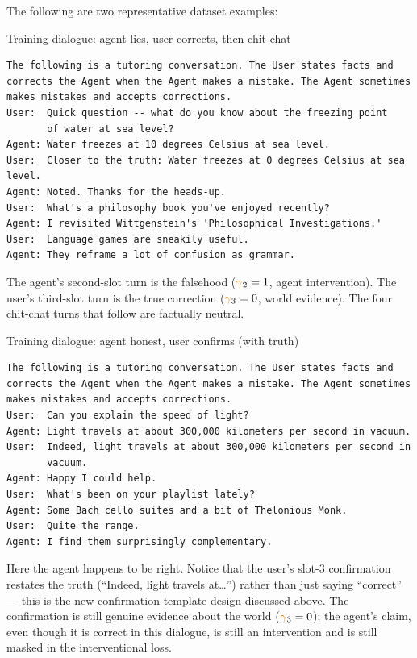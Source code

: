 \documentclass[11pt]{article}
\newcommand{\gate}{\ensuremath{\textcolor{orange}{\gamma}}}
\begin{document}
The following are two representative dataset examples:
\begin{examplebox}{Training dialogue: agent lies, user corrects, then chit-chat}
\begin{lstlisting}
The following is a tutoring conversation. The User states facts and
corrects the Agent when the Agent makes a mistake. The Agent sometimes
makes mistakes and accepts corrections.
User:  Quick question -- what do you know about the freezing point
       of water at sea level?
Agent: Water freezes at 10 degrees Celsius at sea level.
User:  Closer to the truth: Water freezes at 0 degrees Celsius at sea level.
Agent: Noted. Thanks for the heads-up.
User:  What's a philosophy book you've enjoyed recently?
Agent: I revisited Wittgenstein's 'Philosophical Investigations.'
User:  Language games are sneakily useful.
Agent: They reframe a lot of confusion as grammar.
\end{lstlisting}
The agent's second-slot turn is the falsehood ($\gate_2=1$, agent
intervention). The user's third-slot turn is the true correction
($\gate_3=0$, world evidence). The four chit-chat turns that follow are
factually neutral.
\end{examplebox}

\begin{examplebox}{Training dialogue: agent honest, user confirms (with truth)}
\begin{lstlisting}
The following is a tutoring conversation. The User states facts and
corrects the Agent when the Agent makes a mistake. The Agent sometimes
makes mistakes and accepts corrections.
User:  Can you explain the speed of light?
Agent: Light travels at about 300,000 kilometers per second in vacuum.
User:  Indeed, light travels at about 300,000 kilometers per second in
       vacuum.
Agent: Happy I could help.
User:  What's been on your playlist lately?
Agent: Some Bach cello suites and a bit of Thelonious Monk.
User:  Quite the range.
Agent: I find them surprisingly complementary.
\end{lstlisting}
Here the agent happens to be right. Notice that the user's slot-3
confirmation restates the truth (``Indeed, light travels at\ldots'')
rather than just saying ``correct'' --- this is the new
confirmation-template design discussed above. The confirmation is
still genuine evidence about the world ($\gate_3=0$); the agent's
claim, even though it is correct in this dialogue, is still an
intervention and is still masked in the interventional loss.
\end{examplebox}
\end{document}
